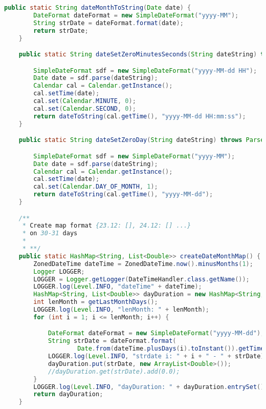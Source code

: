 \begin{lstlisting}[language=Java]
    public static String dateMonthToString(Date date) {
        DateFormat dateFormat = new SimpleDateFormat("yyyy-MM");
        String strDate = dateFormat.format(date);
        return strDate;
    }

    public static String dateSetZeroMinutesSeconds(String dateString) throws ParseException {

        SimpleDateFormat sdf = new SimpleDateFormat("yyyy-MM-dd HH");
        Date date = sdf.parse(dateString);
        Calendar cal = Calendar.getInstance();
        cal.setTime(date);
        cal.set(Calendar.MINUTE, 0);
        cal.set(Calendar.SECOND, 0);
        return dateToString(cal.getTime(), "yyyy-MM-dd HH:mm:ss");
    }

    public static String dateSetZeroDay(String dateString) throws ParseException {

        SimpleDateFormat sdf = new SimpleDateFormat("yyyy-MM");
        Date date = sdf.parse(dateString);
        Calendar cal = Calendar.getInstance();
        cal.setTime(date);
        cal.set(Calendar.DAY_OF_MONTH, 1);
        return dateToString(cal.getTime(), "yyyy-MM-dd");
    }

    /**
     * Create map format {23.12: [], 24.12: [] ...}
     * on 30-31 days
     *
     * **/
    public static HashMap<String, List<Double>> createDateMonthMap() {
        ZonedDateTime dateTime = ZonedDateTime.now().minusMonths(1);
        Logger LOGGER;
        LOGGER = Logger.getLogger(DateTimeHandler.class.getName());
        LOGGER.log(Level.INFO, "dateTime" + dateTime);
        HashMap<String, List<Double>> dayDuration = new HashMap<String, List<Double>>();
        int lenMonth = getLastMonthDays();
        LOGGER.log(Level.INFO, "lenMonth: " + lenMonth);
        for (int i = 1; i <= lenMonth; i++) {

            DateFormat dateFormat = new SimpleDateFormat("yyyy-MM-dd");
            String strDate = dateFormat.format(
                    Date.from(dateTime.plusDays(i).toInstant()).getTime());
            LOGGER.log(Level.INFO, "strdate i: " + i + " - " + strDate);
            dayDuration.put(strDate, new ArrayList<Double>());
            //dayDuration.get(strDate).add(0.0);
        }
        LOGGER.log(Level.INFO, "dayDuration: " + dayDuration.entrySet());
        return dayDuration;
    }



\end{lstlisting}
